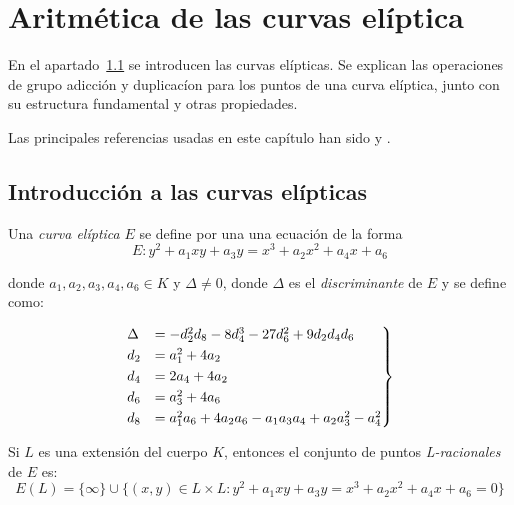 \chapter{Aritmética de las curvas elíptica}
\label{ch:Aritmética de las curvas elíptica}


En el apartado~\ref{sec:Introducción} se introducen las curvas elípticas. Se explican las operaciones de grupo adicción y duplicacíon para los puntos de una curva elíptica, junto con su estructura fundamental y otras propiedades.

Las principales referencias usadas en este capítulo han sido \cite{Washington:2008} y \cite{Hankerson:2003}.


\section{Introducción a las curvas elípticas}
\label{sec:Introducción}

\begin{definicion}
\label{def:curva elíptica}
	Una \emph{curva elíptica} $E$ se define por una una ecuación de la forma
	\begin{equation}
	\label{eq:Weierstrass general}
		E : y^2 + a_1 x y + a_3 y = x^3 + a_2 x^2 + a_4 x + a_6
	\end{equation}

	donde $a_1, a_2, a_3, a_4, a_6 \in K$ y $\Delta \neq 0$, donde $\Delta$ es el \emph{discriminante} de $E$ y se define como:

	\begin{align}
		\label{eq:discriminante}
		\begin{rcases}
		\Delta & = -d_2^2 d_8 - 8 d_4^3 - 27 d_6^2 + 9 d_2 d_4 d_6         \\
		d_2    & = a_1^2 + 4 a_ 2                                          \\
		d_4    & = 2 a_4 + 4 a_2                                           \\
		d_6    & = a_3^2 + 4 a_6                                           \\
		d_8    & = a_1^2 a_6 + 4 a_2 a_6 - a_1 a_3 a_4 + a_2 a_3^2 - a_4^2 \\
		\end{rcases}
	\end{align}

	Si $L$ es una extensión del cuerpo $K$, entonces el conjunto de puntos \emph{L-racionales} de $E$ es:
	$$
	E(L) = \{\infty\} \cup \{(x, y) \in L \times L: y^2 + a_1 x y + a_3 y = x^3 + a_2 x^2 + a_4 x + a_6 = 0\}
	$$
\end{definicion}

